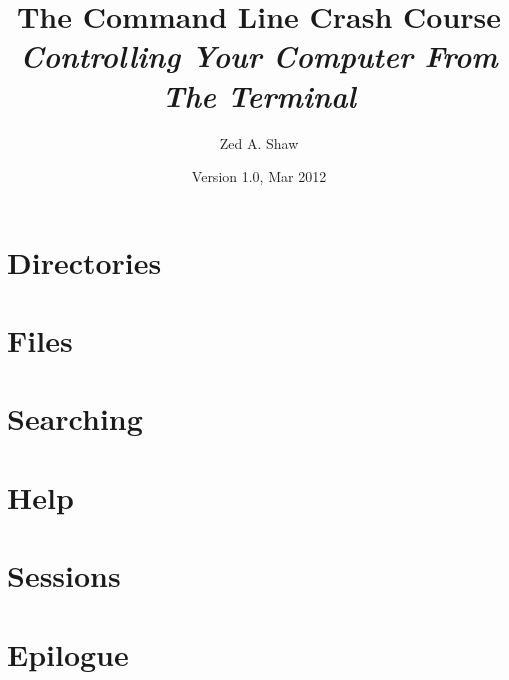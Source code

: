 


\title{
    The Command Line Crash Course\\
    \textit{Controlling Your Computer From The Terminal}
}
\author{Zed A. Shaw}
\date{Version 1.0, Mar 2012}



\frontmatter

\maketitle

\tableofcontents


\mainmatter







\part{Directories}







\part{Files}










\part{Searching}




\part{Help}




\part{Sessions}





\part{Epilogue}



\appendix


